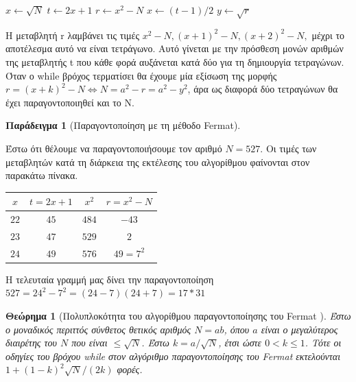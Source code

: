 \documentclass[12pt]{article}
\newtheorem{theorem}{Θεώρημα}[section]
\newtheorem{example}{Παράδειγμα}[section]
\numberwithin{equation}{section}
\begin{document}
\vspace{0.5cm}
\begin{algorithm}[H]
\SetAlgoLined
{}
$x \gets \sqrt{N}$\;
$t \gets 2x + 1$\;
$r \gets x^2 - N$\;
$x \gets (t - 1) / 2$\;
$y \gets \sqrt{r}$\;
\caption{Παραγοντοποίηση με τη μέθοδο του Fermat}
\end{algorithm}
\vspace{0.5cm}

Η μεταβλητή r λαμβάνει τις τιμές $x^2 - N, (x+1)^2 - N, (x+2)^2 - N,$ μέχρι το αποτέλεσμα αυτό να είναι τετράγωνο. Αυτό γίνεται με την πρόσθεση μονών αριθμών της μεταβλητής t που κάθε φορά αυξάνεται κατά δύο για τη δημιουργία τετραγώνων. Όταν ο while βρόχος τερματίσει θα έχουμε μία εξίσωση της μορφής $r = (x+k)^2 - N \iff N = a^2 - r = a^2 - y^2$, άρα ως διαφορά δύο τετραγώνων θα έχει παραγοντοποιηθεί και το Ν. 

\begin{example}[Παραγοντοποίηση με τη μέθοδο Fermat]
\end{example}
Έστω ότι θέλουμε να παραγοντοποιήσουμε τον αριθμό $Ν=527$. Οι τιμές των μεταβλητών κατά τη διάρκεια της εκτέλεσης του αλγορίθμου φαίνονται στον παρακάτω πίνακα. \\
\begin{center}
    \begin{tabular}{|c|c|c|c|}
        \hline
        $x$ & $t=2x+1$ & $x^2$ & $r=x^2-N$ \\
        \hline
        $22$ & $45$ & $484$ & $-43$ \\
        \hline
        $23$ & $47$ & $529$ & $2$ \\
        \hline
        $24$ & $49$ & $576$ & $49=7^2$ \\
        \hline
    \end{tabular}
\end{center}
\vspace{0.5cm}
Η τελευταία γραμμή μας δίνει την παραγοντοποίηση $527=24^2-7^2=(24-7)(24+7)=17*31$

\begin{theorem}[Πολυπλοκότητα του αλγορίθμου παραγοντοποίησης του Fermat \cite{wagstaff2013joy}]
Έστω ο μοναδικός περιττός σύνθετος θετικός αριθμός $N = ab$, όπου $a$ είναι ο μεγαλύτερος διαιρέτης του $N$ που είναι $\leq \sqrt{N}$. Έστω $k = a/\sqrt{N}$, έτσι ώστε $0 < k \leq 1$. Τότε οι οδηγίες του βρόχου while στον αλγόριθμο παραγοντοποίησης του Fermat εκτελούνται $1 + (1 - k)^2 \sqrt{N}/(2k)$ φορές.
\end{theorem}
\end{document}
